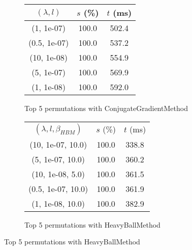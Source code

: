 \begin{figure}[H]
{\begin{subfigure}[ht]{.6\textwidth}
\begin{tabular}{|c|c|c|}
\hline
\rowcolor{gray!25}
$(\lambda,l)$ & $s$ (\%) & $t$ (ms) \\
\hline
(1, 1e-07) & 100.0 & 502.4 \\
(0.5, 1e-07) & 100.0 & 537.2 \\
(10, 1e-08) & 100.0 & 554.9 \\
(5, 1e-07) & 100.0 & 569.9 \\
(1, 1e-08) & 100.0 & 592.0 \\
\hline
\end{tabular}
\caption{Top 5 permutations with ConjugateGradientMethod}
\label{subfig:param_comp_MatrixSquareSum_ConjugateGradientMethod_NewtonsSearch}
\end{subfigure}
\hfill
\begin{subfigure}[ht]{.6\textwidth}
\centering
{}
\begin{tabular}{|c|c|c|}
\hline
\rowcolor{gray!25}
\multicolumn{3}{|c|}{HeavyBallMethod} \\
\hline
\rowcolor{gray!25}
$(\lambda,l,\beta_{HBM})$ & $s$ (\%) & $t$ (ms) \\
\hline
(10, 1e-07, 10.0) & 100.0 & 338.8 \\
(5, 1e-07, 10.0) & 100.0 & 360.2 \\
(10, 1e-08, 5.0) & 100.0 & 361.5 \\
(0.5, 1e-07, 10.0) & 100.0 & 361.9 \\
(1, 1e-08, 10.0) & 100.0 & 382.9 \\
\hline
\end{tabular}
\caption{Top 5 permutations with HeavyBallMethod}
\label{subfig:param_comp_MatrixSquareSum_HeavyBallMethod_NewtonsSearch}
\end{subfigure}
}
\end{figure}

